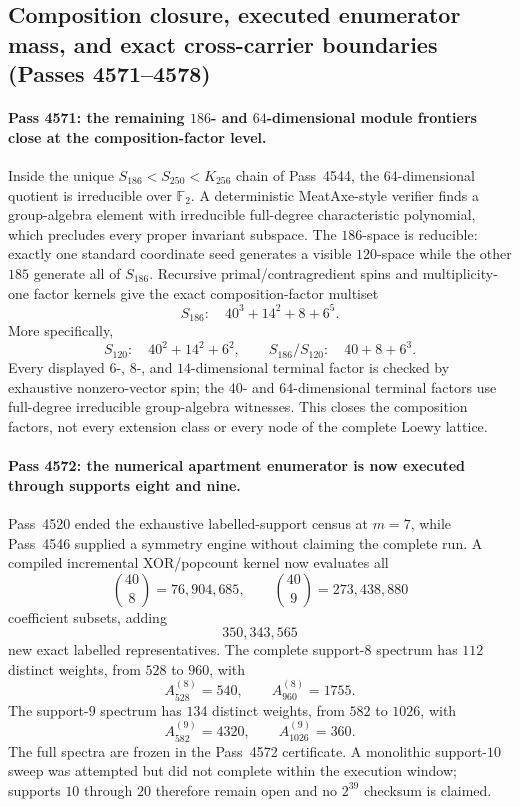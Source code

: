 \subsection{Composition closure, executed enumerator mass, and exact cross-carrier boundaries (Passes 4571--4578)}
\label{sec:pass4571-4578-composition-enumerator-crosscarrier}

\paragraph{Pass 4571: the remaining $186$- and $64$-dimensional module frontiers close at the composition-factor level.}
Inside the unique $S_{186}<S_{250}<K_{256}$ chain of Pass~4544, the $64$-dimensional quotient is irreducible over $\mathbb F_2$.  A deterministic MeatAxe-style verifier finds a group-algebra element with irreducible full-degree characteristic polynomial, which precludes every proper invariant subspace.  The $186$-space is reducible: exactly one standard coordinate seed generates a visible $120$-space while the other $185$ generate all of $S_{186}$.  Recursive primal/contragredient spins and multiplicity-one factor kernels give the exact composition-factor multiset
\[
 \boxed{S_{186}:\quad 40^3+14^2+8+6^5.}
\]
More specifically,
\[
 S_{120}:\quad40^2+14^2+6^2,
 \qquad
 S_{186}/S_{120}:\quad40+8+6^3.
\]
Every displayed $6$-, $8$-, and $14$-dimensional terminal factor is checked by exhaustive nonzero-vector spin; the $40$- and $64$-dimensional terminal factors use full-degree irreducible group-algebra witnesses.  This closes the composition factors, not every extension class or every node of the complete Loewy lattice.

\paragraph{Pass 4572: the numerical apartment enumerator is now executed through supports eight and nine.}
Pass~4520 ended the exhaustive labelled-support census at $m=7$, while Pass~4546 supplied a symmetry engine without claiming the complete run.  A compiled incremental XOR/popcount kernel now evaluates all
\[
 \binom{40}{8}=76{,}904{,}685,
 \qquad
 \binom{40}{9}=273{,}438{,}880
\]
coefficient subsets, adding
\[
 \boxed{350{,}343{,}565}
\]
new exact labelled representatives.  The complete support-$8$ spectrum has $112$ distinct weights, from $528$ to $960$, with
\[
 A^{(8)}_{528}=540,\qquad A^{(8)}_{960}=1755.
\]
The support-$9$ spectrum has $134$ distinct weights, from $582$ to $1026$, with
\[
 A^{(9)}_{582}=4320,\qquad A^{(9)}_{1026}=360.
\]
The full spectra are frozen in the Pass~4572 certificate.  A monolithic support-$10$ sweep was attempted but did not complete within the execution window; supports $10$ through $20$ therefore remain open and no $2^{39}$ checksum is claimed.

